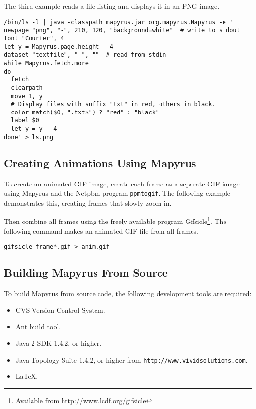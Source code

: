 The third example reads a file listing and displays it in an
PNG image.

\begin{verbatim}
/bin/ls -l | java -classpath mapyrus.jar org.mapyrus.Mapyrus -e '
newpage "png", "-", 210, 120, "background=white"  # write to stdout
font "Courier", 4
let y = Mapyrus.page.height - 4
dataset "textfile", "-", ""  # read from stdin
while Mapyrus.fetch.more
do
  fetch 
  clearpath
  move 1, y
  # Display files with suffix "txt" in red, others in black.
  color match($0, ".txt$") ? "red" : "black"
  label $0
  let y = y - 4
done' > ls.png
\end{verbatim}

\subsection{Creating Animations Using Mapyrus}

To create an animated GIF image, create each frame as a separate
GIF image using Mapyrus and the Netpbm program \texttt{ppmtogif}.
The following example demonstrates this, creating frames that slowly
zoom in.



Then combine all frames using the freely available program
Gifsicle\footnote{Available from http://www.lcdf.org/gifsicle}.
The following command makes an animated GIF file from all frames.

\begin{verbatim}
gifsicle frame*.gif > anim.gif
\end{verbatim}

\subsection{Building Mapyrus From Source}

To build Mapyrus from source code, the following development tools
are required:

\begin{itemize}
\item
CVS Version Control System.
\item
Ant build tool.
\item
Java 2 SDK 1.4.2, or higher.
\item
Java Topology Suite 1.4.2, or higher from \texttt{http://www.vividsolutions.com}.
\item
\LaTeX.
\end{itemize}


